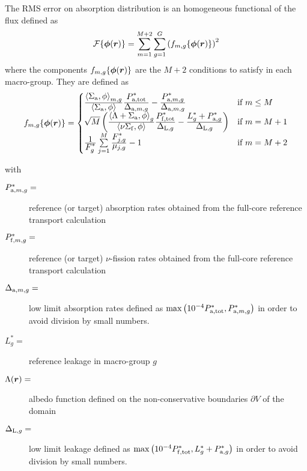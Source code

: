 The RMS error on absorption distribution is an homogeneous functional of the flux defined as
\begin{equation}
{\cal F}\{\bff(\phi)(\bff(r))\}=\sum_{m=1}^{M+2} \sum_{g=1}^G \left( f_{m,g}\{\bff(\phi)(\bff(r))\} \right)^2
\label{eq:eq2.6}
\end{equation}
\noindent where the components $f_{m,g}\{\bff(\phi)(\bff(r))\}$ are the $M+2$ conditions to satisfy in each macro-group. They are defined as
\begin{equation}
f_{m,g}\{\bff(\phi)(\bff(r))\}=\begin{cases} {{\displaystyle \left< \Sigma_{\rm a} , \phi \right>_{m,g}\over\displaystyle  \left< \Sigma_{\rm a} , \phi \right>} {\displaystyle P^*_{{\rm a},{\rm tot}}\over \displaystyle  \Delta_{{\rm a},m,g} } - {\displaystyle  P^*_{{\rm a},m,g} \over \displaystyle \Delta_{{\rm a},m,g} }} & \text{if $m\le M$} \\
\sqrt{M}\left( {\displaystyle \left<\Lambda+\Sigma_{\rm a} , \phi\right>_g\over\displaystyle  \left< \nu\Sigma_{\rm f} ,\phi \right>} {\displaystyle P^*_{{\rm f},{\rm tot}}\over\displaystyle  \Delta_{{\rm L},g} } - {\displaystyle L^*_{g}+P^*_{{\rm a},g} \over\displaystyle  \Delta_{{\rm L},g}}\right) & \text{if $m = M+1$} \\
{\displaystyle 1\over \displaystyle F^*_g}\sum\limits_{j=1}^M {\displaystyle F^*_{j,g} \over \displaystyle \mu_{j,g}} - 1  & \text{if $m= M+2$} \end{cases} 
\label{eq:eq2.7}
\end{equation}

\noindent with
\begin{description}
\item[$P^*_{{\rm a},m,g}=$] reference (or target) absorption rates obtained from the full-core reference transport calculation
\item[$P^*_{{\rm f},m,g}=$] reference (or target) $\nu$-fission rates obtained from the full-core reference transport calculation
\item[$\Delta_{{\rm a},m,g}=$] low limit absorption rates defined as $\max \left( 10^{-4} P^*_{{\rm a},{\rm tot}},P^*_{{\rm a},m,g}\right)$ in order to avoid
division by small numbers.
\item[$L^*_{g}=$] reference leakage in macro-group $g$
\item[$\Lambda(\bff(r))=$] albedo function defined on the non-conservative boundaries $\partial V$ of the domain
\item[$\Delta_{{\rm L},g}=$] low limit leakage defined as $\max \left( 10^{-4} P^*_{{\rm f},{\rm tot}},L^*_{g}+P^*_{{\rm a},g} \right)$ in order to avoid
division by small numbers.
\end{description}

